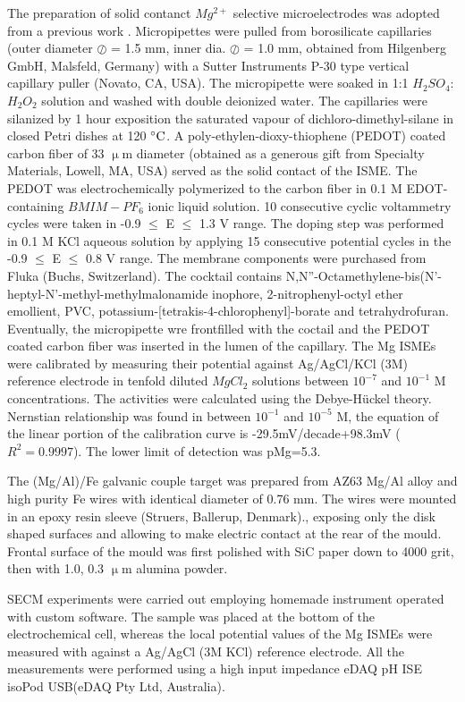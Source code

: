 \documentclass[3p]{elsarticle}
\begin{document}
The preparation of solid contanct $Mg^{2+}$ selective microelectrodes was adopted from a previous work \cite{overmg3}. Micropipettes were pulled from borosilicate capillaries (outer diameter $\oslash$ = 1.5 mm, inner dia. $\oslash$ = 1.0 mm, obtained from Hilgenberg GmbH, Malsfeld, Germany) with a Sutter Instruments P-30 type vertical capillary puller (Novato, CA, USA). The micropipette were soaked in 1:1 $H_2SO_4$:$H_2O_2$ solution and washed with double deionized water. The capillaries were silanized by 1 hour exposition the saturated vapour of dichloro-dimethyl-silane in closed Petri dishes at 120 $\celsius$. A poly-ethylen-dioxy-thiophene (PEDOT) coated carbon fiber of 33 $\upmu$m diameter (obtained as a generous gift from Specialty Materials, Lowell, MA, USA) served as the solid contact of the ISME. The PEDOT was electrochemically polymerized to the carbon fiber in 0.1 M EDOT-containing $BMIM-PF_6$ ionic liquid solution. 10 consecutive cyclic voltammetry cycles were taken in -0.9 $\leq$ E $\leq$ 1.3 V range. The doping step was performed in 0.1 M KCl aqueous solution by applying 15 consecutive potential cycles in the -0.9 $\leq$ E $\leq$ 0.8 V range. The membrane components were purchased from Fluka (Buchs, Switzerland). The cocktail contains N,N''-Octamethylene-bis(N'-heptyl-N'-methyl-methylmalonamide inophore, 2-nitrophenyl-octyl ether emollient, PVC, potassium-[tetrakis-4-chlorophenyl]-borate and tetrahydrofuran. Eventually, the micropipette wre frontfilled with the coctail and the PEDOT coated carbon fiber was inserted in the lumen of the capillary.
The Mg ISMEs were calibrated by measuring their potential against Ag/AgCl/KCl (3M) reference electrode in tenfold diluted $MgCl_2$ solutions between $10^{-7}$ and $10^{-1}$ M concentrations. The activities were calculated using the Debye-Hückel theory. Nernstian relationship was found in between $10^{-1}$ and $10^{-5}$ M, the equation of the linear portion of the calibration curve is -29.5mV/decade+98.3mV ($R^2=0.9997$). The lower limit of detection was pMg=5.3. 

The (Mg/Al)/Fe galvanic couple target was prepared from  AZ63 Mg/Al alloy and high purity Fe wires with identical diameter of 0.76 mm. The wires were mounted in an epoxy resin sleeve (Struers, Ballerup, Denmark)., exposing only the disk shaped surfaces and allowing to make electric contact at the rear of the mould. Frontal surface of the mould was first polished with SiC paper down to 4000 grit, then with 1.0, 0.3 $\upmu$m alumina powder.

SECM experiments were carried out employing homemade instrument operated with custom software. The sample was placed at the bottom of the electrochemical cell, whereas the local potential values of the Mg ISMEs were measured with against a Ag/AgCl (3M KCl) reference electrode. All the measurements were performed using a high input impedance eDAQ pH ISE isoPod USB(eDAQ Pty Ltd, Australia).
\end{document}
